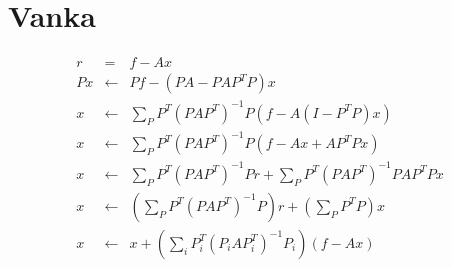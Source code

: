 \documentclass[11pt]{article}
\begin{document}
\section{Vanka}
\begin{eqnarray}
 r &=& f - Ax \\
 Px &\leftarrow& Pf - (PA - PAP^T P)x \\
 x &\leftarrow& \sum_P P^T (PAP^T)^{-1} P (f - A(I - P^T P)x) \\
 x &\leftarrow& \sum_P P^T (PAP^T)^{-1} P (f - Ax + AP^T Px) \\
 x &\leftarrow& \sum_P P^T (PAP^T)^{-1} P r + \sum_P P^T (PAP^T)^{-1} P AP^T Px \\
 x &\leftarrow& (\sum_P P^T (PAP^T)^{-1} P) r + (\sum_P P^T P)x \\
 x &\leftarrow& x + \left(\sum_i P_i^T \left(P_iAP_i^T\right)^{-1} P_i\right) (f - Ax)
\end{eqnarray}

\end{document}
